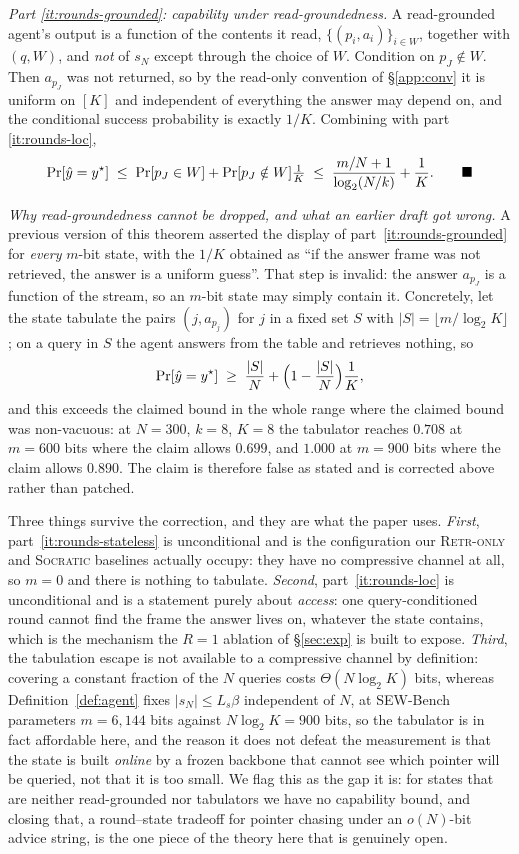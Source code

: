 \documentclass[10pt]{article}
\theoremstyle{definition}
\theoremstyle{plain}
\newcommand{\qedmark}{\ensuremath{\blacksquare}}
\newcommand{\proofenddisp}{\tag*{\qedmark}}
\begin{document}
\emph{Part \ref{it:rounds-grounded}: capability under read-groundedness.} A read-grounded agent's output is a function of the contents it read, $\{(p_i,a_i)\}_{i\in W}$, together with $(q,W)$, and \emph{not} of $s_N$ except through the choice of $W$. Condition on $p_J\notin W$. Then $a_{p_J}$ was not returned, so by the read-only convention of \S\ref{app:conv} it is uniform on $[K]$ and independent of everything the answer may depend on, and the conditional success probability is exactly $1/K$. Combining with part \ref{it:rounds-loc},
\begin{equation*}
\Pr[\hat y=y^{\star}]\;\le\;\Pr[p_J\in W]+\Pr[p_J\notin W]\tfrac1K\;\le\;\frac{m/N+1}{\log_2(N/k)}+\frac1K. \proofenddisp
\end{equation*}

\emph{Why read-groundedness cannot be dropped, and what an earlier draft got wrong.} A previous version of this theorem asserted the display of part~\ref{it:rounds-grounded} for \emph{every} $m$-bit state, with the $1/K$ obtained as ``if the answer frame was not retrieved, the answer is a uniform guess''. That step is invalid: the answer $a_{p_J}$ is a function of the stream, so an $m$-bit state may simply contain it. Concretely, let the state tabulate the pairs $(j,a_{p_j})$ for $j$ in a fixed set $S$ with $|S|=\lfloor m/\log_2 K\rfloor$; on a query in $S$ the agent answers from the table and retrieves nothing, so
\[
\Pr[\hat y=y^{\star}]\;\ge\;\frac{|S|}{N}+\Bigl(1-\frac{|S|}{N}\Bigr)\frac1K ,
\]
and this exceeds the claimed bound in the whole range where the claimed bound was non-vacuous: at $N{=}300$, $k{=}8$, $K{=}8$ the tabulator reaches $0.708$ at $m{=}600$ bits where the claim allows $0.699$, and $1.000$ at $m{=}900$ bits where the claim allows $0.890$. The claim is therefore false as stated and is corrected above rather than patched.

Three things survive the correction, and they are what the paper uses. \emph{First}, part~\ref{it:rounds-stateless} is unconditional and is the configuration our \textsc{Retr-only} and \textsc{Socratic} baselines actually occupy: they have no compressive channel at all, so $m=0$ and there is nothing to tabulate. \emph{Second}, part~\ref{it:rounds-loc} is unconditional and is a statement purely about \emph{access}: one query-conditioned round cannot find the frame the answer lives on, whatever the state contains, which is the mechanism the $R{=}1$ ablation of \S\ref{sec:exp} is built to expose. \emph{Third}, the tabulation escape is not available to a compressive channel by definition: covering a constant fraction of the $N$ queries costs $\Theta(N\log_2K)$ bits, whereas Definition~\ref{def:agent} fixes $|s_N|\le L_s\beta$ independent of $N$, at SEW-Bench parameters $m=6{,}144$ bits against $N\log_2K=900$ bits, so the tabulator is in fact affordable here, and the reason it does not defeat the measurement is that the state is built \emph{online} by a frozen backbone that cannot see which pointer will be queried, not that it is too small. We flag this as the gap it is: for states that are neither read-grounded nor tabulators we have no capability bound, and closing that, a round--state tradeoff for pointer chasing under an $o(N)$-bit advice string, is the one piece of the theory here that is genuinely open.
\end{document}
